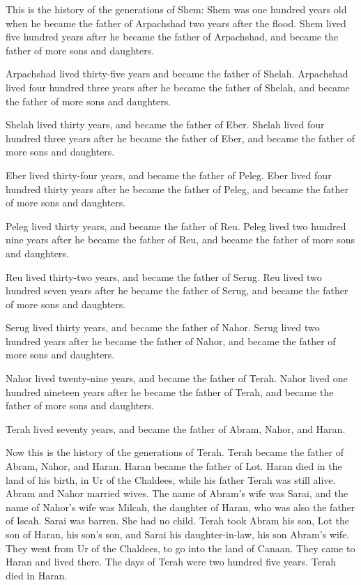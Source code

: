  This is the history of the generations of Shem: Shem was
one hundred years old when he became the father of Arpachshad two years
after the flood.  Shem lived five hundred years after he
became the father of Arpachshad, and became the father of more sons and
daughters.

 Arpachshad lived thirty-five years and became the father
of Shelah.  Arpachshad lived four hundred three years after
he became the father of Shelah, and became the father of more sons and
daughters.

 Shelah lived thirty years, and became the father of Eber.
 Shelah lived four hundred three years after he became the
father of Eber, and became the father of more sons and daughters.

 Eber lived thirty-four years, and became the father of
Peleg.  Eber lived four hundred thirty years after he
became the father of Peleg, and became the father of more sons and
daughters.

 Peleg lived thirty years, and became the father of Reu.
 Peleg lived two hundred nine years after he became the
father of Reu, and became the father of more sons and daughters.

 Reu lived thirty-two years, and became the father of
Serug.  Reu lived two hundred seven years after he became
the father of Serug, and became the father of more sons and daughters.

 Serug lived thirty years, and became the father of Nahor.
 Serug lived two hundred years after he became the father
of Nahor, and became the father of more sons and daughters.

 Nahor lived twenty-nine years, and became the father of
Terah.  Nahor lived one hundred nineteen years after he
became the father of Terah, and became the father of more sons and
daughters.

 Terah lived seventy years, and became the father of Abram,
Nahor, and Haran.

 Now this is the history of the generations of Terah. Terah
became the father of Abram, Nahor, and Haran. Haran became the father of
Lot.  Haran died in the land of his birth, in Ur of the
Chaldees, while his father Terah was still alive.  Abram
and Nahor married wives. The name of Abram's wife was Sarai, and the
name of Nahor's wife was Milcah, the daughter of Haran, who was also the
father of Iscah.  Sarai was barren. She had no child.
 Terah took Abram his son, Lot the son of Haran, his son's
son, and Sarai his daughter-in-law, his son Abram's wife. They went from
Ur of the Chaldees, to go into the land of Canaan. They came to Haran
and lived there.  The days of Terah were two hundred five
years. Terah died in Haran.

